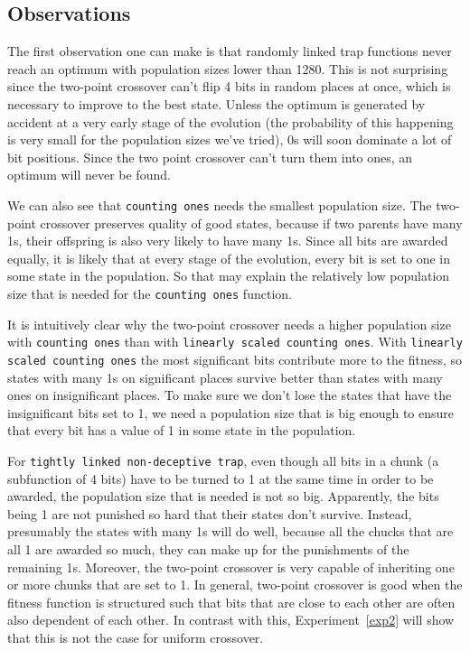 \documentclass[12pt]{article}
\theoremstyle{definition}
\newcommand{\co}{\texttt{counting ones}}
\newcommand{\lsco}{\texttt{linearly scaled counting ones}}
\newcommand{\tnt}{\texttt{tightly linked non-deceptive trap}}
\begin{document}
\subsection*{Observations}
The first observation one can make is that randomly linked trap functions never reach an optimum with population sizes lower than 1280.
This is not surprising since the two-point crossover can't flip 4 bits in random places at once,
which is necessary to improve to the best state.
Unless the optimum is generated by accident at a very early stage of the evolution
(the probability of this happening is very small for the population sizes we've tried),
0s will soon dominate a lot of bit positions.
Since the two point crossover can't turn them into ones, an optimum will never be found.


We can also see that \co{} needs the smallest population size.
The two-point crossover preserves quality of good states, because if two parents have many 1s,
their offspring is also very likely to have many 1s.
Since all bits are awarded equally, it is likely that at every stage of the evolution,
every bit is set to one in some state in the population.
So that may explain the relatively low population size that is needed for the \co{} function.

It is intuitively clear why the two-point crossover needs a higher population size
with \co{} than with \lsco{}.
With \lsco{} the most significant bits contribute more to the fitness, so states with many 1s
on significant places survive better than states with many ones on insignificant places.
To make sure we don't lose the states that have the insignificant bits set to 1, we need
a population size that is big enough to ensure that every bit has a value of 1
in some state in the population.

For \tnt{}, even though all bits in a chunk (a subfunction of 4 bits) have to be turned to 1
at the same time in order to be awarded, the population size that is needed is not so big.
Apparently, the bits being 1 are not punished so hard that their states don't survive.
Instead, presumably the states with many 1s will do well, because all the chucks that
are all 1 are awarded so much, they can make up for the punishments of the remaining 1s.
Moreover, the two-point crossover is very capable of inheriting one or more chunks that are
set to 1.
In general, two-point crossover is good when the fitness function is structured such that
bits that are close to each other are often also dependent of each other.
In contrast with this, Experiment~\ref{exp2} will show that this is not the case for
uniform crossover.
\end{document}
